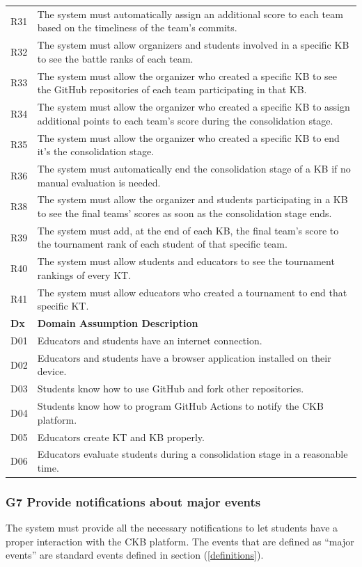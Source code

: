 \documentclass[11pt]{report}
\begin{document}
\begin{longtable}[h] {|p{10mm} p{130mm}|}
R31 & The system must automatically assign an additional score to each team based on the timeliness of the team’s commits. \\ 
R32 & The system must allow organizers and students involved in a specific KB to see the battle ranks of each team. \\ 
R33 & The system must allow the organizer who created a specific KB to see the GitHub repositories of each team participating in that KB. \\ 
R34 & The system must allow the organizer who created a specific KB to assign additional points to each team’s score during the consolidation stage. \\ 
R35 & The system must allow the organizer who created a specific KB to end it’s the consolidation stage. \\ 
R36 & The system must automatically end the consolidation stage of a KB if no manual evaluation is needed. \\ 
R38 & The system must allow the organizer and students participating in a KB to see the final teams’ scores as soon as the consolidation stage ends. \\ 
R39 & The system must add, at the end of each KB, the final team’s score to the tournament rank of each student of that specific team. \\ 
R40 & The system must allow students and educators to see the tournament rankings of every KT. \\ 
R41 & The system must allow educators who created a tournament to end that specific KT. \\ 
\hline
\textbf{Dx} & \textbf{Domain Assumption Description} \\ \hline
D01 & Educators and students have an internet connection. \\ 
D02 & Educators and students have a browser application installed on their device.  \\ 
D03 & Students know how to use GitHub and fork other repositories.  \\ 
D04 & Students know how to program GitHub Actions to notify the CKB platform.  \\ 
D05 & Educators create KT and KB properly.  \\ 
D06 & Educators evaluate students during a consolidation stage in a reasonable time.  \\ \hline
\end{longtable}


\subsubsection{G7  Provide notifications about major events} 
The system must provide all the necessary notifications to let students have a proper interaction with the 
CKB platform. The events that are defined as ``major events'' are standard events defined in section (\ref{definitions}).
\end{document}
